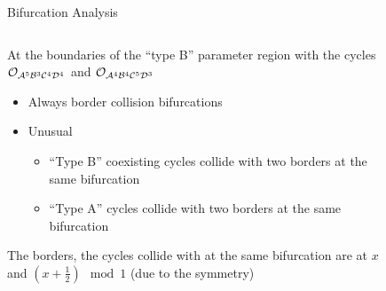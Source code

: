 \begin{frame}{Bifurcation Analysis}
	\vspace{-1em}
	\begin{columns}
		\begin{column}{.5 \textwidth}
			At the boundaries of the ``type B'' parameter region with the cycles $\mathcal{O}_{\mathcal{A}^5\mathcal{B}^3\mathcal{C}^4\mathcal{D}^4}$ and $\mathcal{O}_{\mathcal{A}^4\mathcal{B}^4\mathcal{C}^5\mathcal{D}^3}$
			\pause
			\begin{itemize}
				\item Always border collision bifurcations
				\item Unusual \begin{itemize}
					      \item ``Type B'' coexisting cycles collide with two borders at the same bifurcation
					      \item ``Type A'' cycles collide with two borders at the same bifurcation
				      \end{itemize}
			\end{itemize}
			\vspace{.5em}
			The borders, the cycles collide with at the same bifurcation are at $x$ and $(x + \frac{1}{2}) \mod 1$ (due to the symmetry)
		\end{column}
		\begin{column}{.5 \textwidth}
			\vspace{-5em}
			\begin{figure}
				\centering
\end{figure}
\end{column}
\end{columns}
\end{frame}
